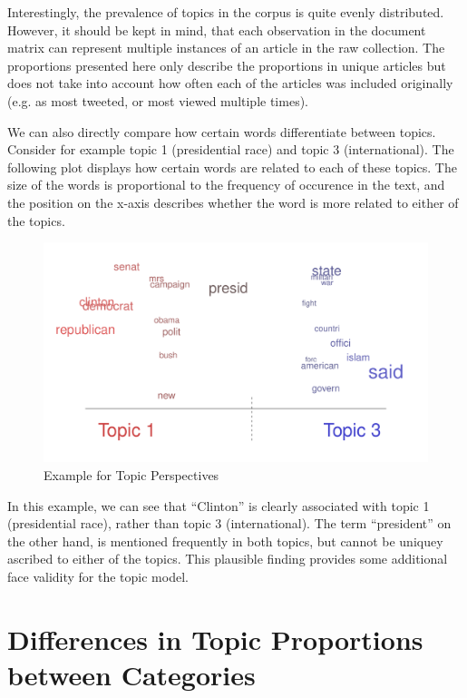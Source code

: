 \documentclass[12pt]{article}
\begin{document}
\begin{doublespace}
Interestingly, the prevalence of topics in the corpus is quite evenly distributed. However, it should be kept in mind, that each observation in the document matrix can represent multiple instances of an article in the raw collection. The proportions presented here only describe the proportions in unique articles but does not take into account how often each of the articles was included originally (e.g. as most tweeted, or most viewed multiple times). 

We can also directly compare how certain words differentiate between topics. Consider for example topic 1 (presidential race) and topic 3 (international). The following plot displays how certain words are related to each of these topics. The size of the words is proportional to the frequency of occurence in the text, and the position on the x-axis describes whether the word is more related to either of the topics.

\begin{figure}
\caption{Example for Topic Perspectives}\label{fig:perspectives}
\includegraphics[width=\textwidth]{../calc/fig/perspective} 
\end{figure}

In this example, we can see that ``Clinton'' is clearly associated with topic 1 (presidential race), rather than topic 3 (international). The term ``president'' on the other hand, is mentioned frequently in both topics, but cannot be uniquey ascribed to either of the topics. This plausible finding provides some additional face validity for the topic model.


\section{Differences in Topic Proportions between Categories}


\end{doublespace}
\end{document}
